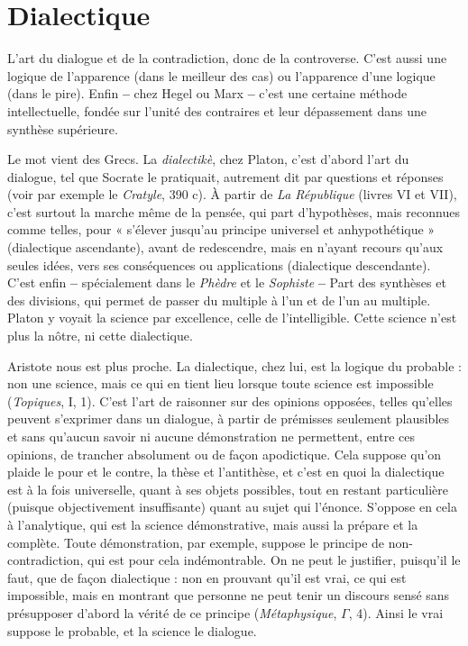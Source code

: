 \section{Dialectique}
L’art du dialogue et de la contradiction, donc de la controverse.
C’est aussi une logique de l’apparence (dans le
meilleur des cas) ou l’apparence d’une logique (dans le pire). Enfin {\bf --} chez
Hegel ou Marx {\bf --} c’est une certaine méthode intellectuelle, fondée sur l'unité
des contraires et leur dépassement dans une synthèse supérieure.

Le mot vient des Grecs. La {\it dialectikè}, chez Platon, c’est d’abord l’art du dialogue,
tel que Socrate le pratiquait, autrement dit par questions et réponses
(voir par exemple le {\it Cratyle}, 390 c). À partir de {\it La République} (livres VI
et VII), c’est surtout la marche même de la pensée, qui part d’hypothèses,
mais reconnues comme telles, pour « s'élever jusqu’au principe universel et
anhypothétique » (dialectique ascendante), avant de redescendre, mais en
n'ayant recours qu'aux seules idées, vers ses conséquences ou applications (dialectique
descendante). C’est enfin {\bf --} spécialement dans le {\it Phèdre} et le {\it Sophiste} {\bf --}
Part des synthèses et des divisions, qui permet de passer du multiple à l’un et
de l’un au multiple. Platon y voyait la science par excellence, celle de l’intelligible.
Cette science n’est plus la nôtre, ni cette dialectique.

Aristote nous est plus proche. La dialectique, chez lui, est la logique du
probable : non une science, mais ce qui en tient lieu lorsque toute science est
impossible ({\it Topiques}, I, 1). C’est l’art de raisonner sur des opinions opposées,
telles qu’elles peuvent s'exprimer dans un dialogue, à partir de prémisses seulement
plausibles et sans qu’aucun savoir ni aucune démonstration ne permettent,
entre ces opinions, de trancher absolument ou de façon apodictique. Cela
suppose qu’on plaide le pour et le contre, la thèse et l’antithèse, et c’est en quoi
la dialectique est à la fois universelle, quant à ses objets possibles, tout en restant
particulière (puisque objectivement insuffisante) quant au sujet qui
l’énonce. S’oppose en cela à l’analytique, qui est la science démonstrative, mais
aussi la prépare et la complète. Toute démonstration, par exemple, suppose le
principe de non-contradiction, qui est pour cela indémontrable. On ne peut le
justifier, puisqu'il le faut, que de façon dialectique : non en prouvant qu’il est
vrai, ce qui est impossible, mais en montrant que personne ne peut tenir un
discours sensé sans présupposer d’abord la vérité de ce principe ({\it Métaphysique},
$\Gamma$, 4). Ainsi le vrai suppose le probable, et la science le dialogue.

